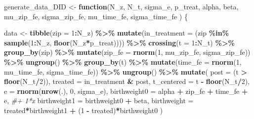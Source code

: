 \documentclass[
]{article}
\newenvironment{Shaded}{\begin{snugshade}}{\end{snugshade}}
\newcommand{\AttributeTok}[1]{\textcolor[rgb]{0.13,0.29,0.53}{#1}}
\newcommand{\CommentTok}[1]{\textcolor[rgb]{0.56,0.35,0.01}{\textit{#1}}}
\newcommand{\ControlFlowTok}[1]{\textcolor[rgb]{0.13,0.29,0.53}{\textbf{#1}}}
\newcommand{\DecValTok}[1]{\textcolor[rgb]{0.00,0.00,0.81}{#1}}
\newcommand{\FunctionTok}[1]{\textcolor[rgb]{0.13,0.29,0.53}{\textbf{#1}}}
\newcommand{\NormalTok}[1]{#1}
\newcommand{\OtherTok}[1]{\textcolor[rgb]{0.56,0.35,0.01}{#1}}
\newcommand{\SpecialCharTok}[1]{\textcolor[rgb]{0.81,0.36,0.00}{\textbf{#1}}}
\begin{document}
\begin{Shaded}
\begin{Highlighting}[]
\NormalTok{generate\_data\_DID }\OtherTok{\textless{}{-}} \ControlFlowTok{function}\NormalTok{(N\_z,}
\NormalTok{                              N\_t,}
\NormalTok{                              sigma\_e,}
\NormalTok{                              p\_treat,}
\NormalTok{                              alpha,}
\NormalTok{                              beta,}
\NormalTok{                              mu\_zip\_fe, }
\NormalTok{                              sigma\_zip\_fe,}
\NormalTok{                              mu\_time\_fe, }
\NormalTok{                              sigma\_time\_fe}
\NormalTok{                             ) \{}
  
\NormalTok{  data }\OtherTok{\textless{}{-}} \FunctionTok{tibble}\NormalTok{(}\AttributeTok{zip =} \DecValTok{1}\SpecialCharTok{:}\NormalTok{N\_z) }\SpecialCharTok{\%\textgreater{}\%}
    \FunctionTok{mutate}\NormalTok{(}\AttributeTok{in\_treatment =}\NormalTok{ (zip }\SpecialCharTok{\%in\%} \FunctionTok{sample}\NormalTok{(}\DecValTok{1}\SpecialCharTok{:}\NormalTok{N\_z, }\FunctionTok{floor}\NormalTok{(N\_z}\SpecialCharTok{*}\NormalTok{p\_treat)))) }\SpecialCharTok{\%\textgreater{}\%} 
    \FunctionTok{crossing}\NormalTok{(}\AttributeTok{t =} \DecValTok{1}\SpecialCharTok{:}\NormalTok{N\_t) }\SpecialCharTok{\%\textgreater{}\%}
    \FunctionTok{group\_by}\NormalTok{(zip) }\SpecialCharTok{\%\textgreater{}\%}
    \FunctionTok{mutate}\NormalTok{(}\AttributeTok{zip\_fe =} \FunctionTok{rnorm}\NormalTok{(}\DecValTok{1}\NormalTok{, mu\_zip\_fe, sigma\_zip\_fe)) }\SpecialCharTok{\%\textgreater{}\%}
    \FunctionTok{ungroup}\NormalTok{() }\SpecialCharTok{\%\textgreater{}\%}
    \FunctionTok{group\_by}\NormalTok{(t) }\SpecialCharTok{\%\textgreater{}\%}
    \FunctionTok{mutate}\NormalTok{(}\AttributeTok{time\_fe =} \FunctionTok{rnorm}\NormalTok{(}\DecValTok{1}\NormalTok{, mu\_time\_fe, sigma\_time\_fe)) }\SpecialCharTok{\%\textgreater{}\%}
    \FunctionTok{ungroup}\NormalTok{() }\SpecialCharTok{\%\textgreater{}\%}
    \FunctionTok{mutate}\NormalTok{(}
      \AttributeTok{post =}\NormalTok{ (t }\SpecialCharTok{\textgreater{}} \FunctionTok{floor}\NormalTok{(N\_t}\SpecialCharTok{/}\DecValTok{2}\NormalTok{)),}
      \AttributeTok{treated =}\NormalTok{ in\_treatment }\SpecialCharTok{\&}\NormalTok{ post, }
      \AttributeTok{t\_centered =}\NormalTok{ t }\SpecialCharTok{{-}} \FunctionTok{floor}\NormalTok{(N\_t}\SpecialCharTok{/}\DecValTok{2}\NormalTok{),}
      \AttributeTok{e =} \FunctionTok{rnorm}\NormalTok{(}\FunctionTok{nrow}\NormalTok{(.), }\DecValTok{0}\NormalTok{, sigma\_e),}
      \AttributeTok{birthweight0 =}\NormalTok{ alpha }\SpecialCharTok{+}\NormalTok{ zip\_fe }\SpecialCharTok{+}\NormalTok{ time\_fe }\SpecialCharTok{+}\NormalTok{ e, }\CommentTok{\#+ 1*x}
      \AttributeTok{birthweight1 =}\NormalTok{ birthweight0 }\SpecialCharTok{+}\NormalTok{ beta,}
      \AttributeTok{birthweight =}\NormalTok{ treated}\SpecialCharTok{*}\NormalTok{birthweight1 }\SpecialCharTok{+}\NormalTok{ (}\DecValTok{1} \SpecialCharTok{{-}}\NormalTok{ treated)}\SpecialCharTok{*}\NormalTok{birthweight0}
\NormalTok{    )}
  

\end{Highlighting}
\end{Shaded}
\end{document}
